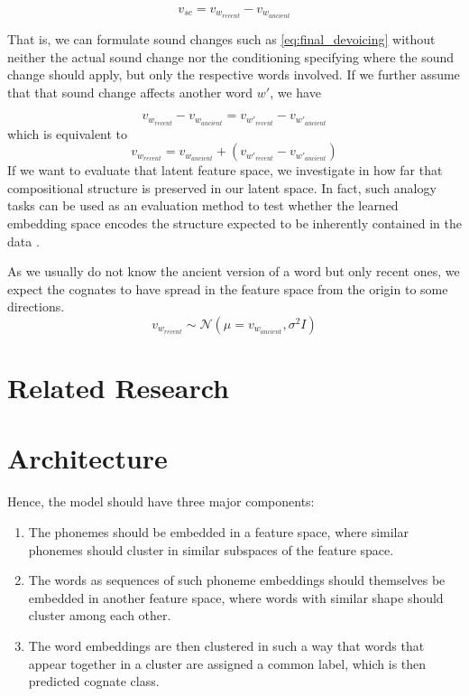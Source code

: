 \documentclass[8pt]{article}
\begin{document}
\begin{equation}
v_{sc} =  v_{w_{recent}} - v_{w_{ancient}} 
\end{equation}

That is, we can formulate sound changes such as \ref{eq:final_devoicing} without neither the actual sound change nor the conditioning specifying where the sound change should apply, but only the respective words involved.
If we further assume that that sound change affects another word $w'$, we have

\begin{equation}
v_{w_{recent}} - v_{w_{ancient}}  =  v_{w'_{recent}} - v_{w'_{ancient}} 
\end{equation}
which is equivalent to
\begin{equation}
v_{w_{recent}}  =   v_{w_{ancient}}  + (v_{w'_{recent}} - v_{w'_{ancient}}) 
\end{equation}
If we want to evaluate that latent feature space, we investigate in how far that compositional structure is preserved in our latent space. In fact, such analogy tasks can be used as an evaluation method to test whether the learned embedding space encodes the structure expected to be inherently contained in the data \cite{mikolov2013distributed}.

As we usually do not know the ancient version of a word but only recent ones, we expect the cognates to have spread in the feature space from the origin to some directions.
\begin{equation}
v_{w_{recent}} \sim \mathcal{N}(\mu = v_{w_{ancient}},\sigma ^2 I)
\end{equation}

\section{Related Research}
\section{Architecture}
Hence, the model should have three major components:
\begin{enumerate}
\item The phonemes should be embedded in a feature space, where similar phonemes should cluster in similar subspaces of the feature space. 
\item The words as sequences of such phoneme embeddings should themselves be embedded in another feature space, where words with similar shape should cluster among each other. 
\item The word embeddings are then clustered in such a way that words that appear together in a cluster are assigned a common label, which is then predicted cognate class.
\end{enumerate}
\end{document}
